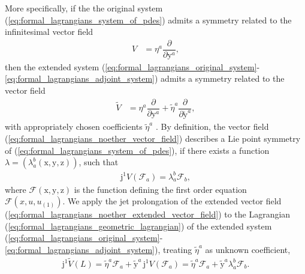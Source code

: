 \documentclass[12pt,a4paper,reqno]{article}
\begin{document}
More specifically, if the the original system (\ref{eq:formal_lagrangians_system_of_pdes}) admits a symmetry related to the infinitesimal vector field
\begin{align}\label{eq:formal_lagrangians_noether_vector_field}
V &= \eta^{a} \dfrac{\partial}{\partial {\ensuremath{{\ensuremath{\mathrm{{y}}}}}}^{a}} ,
\end{align}
then the extended system (\ref{eq:formal_lagrangians_original_system}-\ref{eq:formal_lagrangians_adjoint_system}) admits a symmetry related to the vector field
\begin{align}\label{eq:formal_lagrangians_noether_extended_vector_field}
\tilde{V}
&= \eta^{a} \dfrac{\partial}{\partial {\ensuremath{{\ensuremath{\mathrm{{y}}}}}}^{a}}
 + \tilde{\eta}^{a} \dfrac{\partial}{\partial \tilde{\ensuremath{{\ensuremath{\mathrm{{y}}}}}}^{a}} ,
\end{align}
with appropriately chosen coefficients $\tilde{\eta}^{a}$ \cite{Ibragimov:2007a}.
By definition, the vector field (\ref{eq:formal_lagrangians_noether_vector_field}) describes a Lie point symmetry of (\ref{eq:formal_lagrangians_system_of_pdes}), if there exists a function $\lambda = (\lambda_{a}^{b} ({\ensuremath{{\ensuremath{\mathrm{{x}}}}}}, {\ensuremath{{\ensuremath{\mathrm{{y}}}}}}, {\ensuremath{{\ensuremath{\mathrm{{z}}}}}}) )$, such that
\begin{align}\label{eq:formal_lagrangians_noether_symmetry_equation}
{\ensuremath{\mathrm{j}}}^{1} V (\mathcal{F}_{a}) = \lambda_{a}^{b} \mathcal{F}_{b} ,
\end{align}
where $\mathcal{F} ({\ensuremath{{\ensuremath{\mathrm{{x}}}}}}, {\ensuremath{{\ensuremath{\mathrm{{y}}}}}}, {\ensuremath{{\ensuremath{\mathrm{{z}}}}}})$ is the function defining the first order equation $\mathcal{F} ({\ensuremath{{\ensuremath{{x}}}}}, {\ensuremath{{\ensuremath{{u}}}}}, {\ensuremath{{\ensuremath{{u}}}}}_{(1)})$.
We apply the jet prolongation of the extended vector field (\ref{eq:formal_lagrangians_noether_extended_vector_field}) to the Lagrangian (\ref{eq:formal_lagrangians_geometric_lagrangian}) of the extended system (\ref{eq:formal_lagrangians_original_system}-\ref{eq:formal_lagrangians_adjoint_system}), treating $\tilde{\eta}^{a}$ as unknown coefficient,
\begin{align}\label{eq:formal_lagrangians_noether_symmetry_condition}
{\ensuremath{\mathrm{j}}}^{1} \tilde{V} (L) = \tilde{\eta}^{a} \mathcal{F}_{a} + \tilde{\ensuremath{{\ensuremath{\mathrm{{y}}}}}}^{a} \, {\ensuremath{\mathrm{j}}}^{1} V (\mathcal{F}_{a}) = \tilde{\eta}^{a} \mathcal{F}_{a} + \tilde{\ensuremath{{\ensuremath{\mathrm{{y}}}}}}^{a} \lambda_{a}^{b} \mathcal{F}_{b} .
\end{align}
\end{document}
